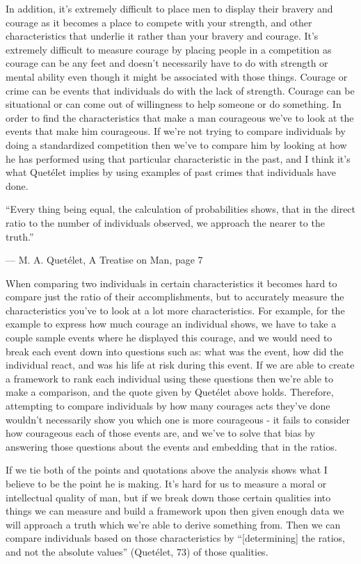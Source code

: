 \documentclass[11pt, oneside]{article}
\begin{document}
\par In addition, it's extremely difficult to place men to display their bravery and courage as it becomes a place to compete with your strength, and other characteristics that underlie it rather than your bravery and courage. It's extremely difficult to measure courage by placing people in a competition as courage can be any feet and doesn't necessarily have to do with strength or mental ability even though it might be associated with those things. Courage or crime can be events that individuals do with the lack of strength. Courage can be situational or can come out of willingness to help someone or do something. In order to find the characteristics that make a man courageous we've to look at the events that make him courageous. If we're not trying to compare individuals by doing a standardized competition then we've to compare him by looking at how he has performed using that particular characteristic in the past, and I think it's what  Quet\'{e}let implies by using examples of past crimes that individuals have done. 

\epigraph{``Every thing being equal, the calculation of probabilities shows, that in the direct ratio to the number of individuals observed, we approach the nearer to the truth.''}{--- \textup{M. A. Quet\'{e}let}, A Treatise on Man, page 7} 

\par When comparing two individuals in certain characteristics it becomes hard to compare just the ratio of their accomplishments, but to accurately measure the characteristics you've to look at a lot more characteristics. For example, for the example to express how much courage an individual shows, we have to take a couple sample events where he displayed this courage, and we would need to break each event down into questions such as: what was the event, how did the individual react, and was his life at risk during this event. If we are able to create a framework to rank each individual using these questions then we're able to make a comparison, and the quote given by Quet\'{e}let above holds. Therefore, attempting to compare individuals by how many courages acts they've done wouldn't necessarily show you which one is more courageous - it fails to consider how courageous each of those events are, and we've to solve that bias by answering those questions about the events and embedding that in the ratios.

\par If we tie both of the points and quotations above the analysis shows what I believe to be the point he is making. It's hard for us to measure a moral or intellectual quality of man, but if we break down those certain qualities into things we can measure and build a framework upon then given enough data we will approach a truth which we're able to derive something from. Then we can compare individuals based on those characteristics by ``[determining] the ratios, and not the absolute values'' (Quet\'{e}let, 73) of those qualities.
\end{document}

